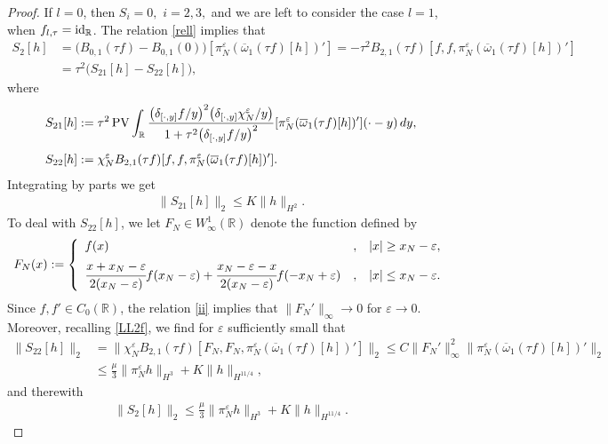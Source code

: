 \documentclass[11pt,reqno]{amsart}
\numberwithin{equation}{section}
\newcommand{\PV}{\mathop{\rm PV}\nolimits}
\newcommand{\0}{\Omega}
\newcommand{\e}{\varepsilon}
\newcommand{\ov}{\overline}
\newcommand{\oo}{\ov\omega}
\newcommand{\R}{\mathbb{R}}
\numberwithin{equation}{section}
\begin{document}
\begin{proof}
If $l=0$, then $S_i=0,$ $i=2,3,$ and   we are left to consider the case $l=1$, when $f_{l,\tau}={\rm id}_\R $.
The relation \eqref{rell} implies that
\begin{align*}
 S_2[h]&= \big(B_{0,1}(\tau f) -B_{0,1}(0)\big)  [\pi^\e_N(\oo_1(\tau f)[h])' ]=-\tau^2B_{2,1}(\tau f) [f,f,\pi^\e_N(\oo_1(\tau f)[h])' ]\\[1ex]
 &=\tau^2\big(S_{21}[h]-S_{22}[h]\big),
\end{align*}
where
\begin{align*}
 S_{21}[h]&:= \tau^2\PV\int_\R\frac{\big(\delta_{[\cdot,y]} f/y\big)^2\big(\delta_{[\cdot,y]}\chi_N^\e/y\big)}{1+\tau^2\big( \delta_{[\cdot,y]} f/y\big)^2}[\pi^\e_N(\oo_1(\tau f)[h])' ](\cdot-y)\, dy,\\[1ex]
 S_{22}[h]&:= \chi_N^\e B_{2,1}( \tau f) [f,f, \pi^\e_N(\oo_1(\tau f)[h])' ].
\end{align*}
Integrating by parts we get
\begin{align*}
  \|S_{21}[h]\|_{2}\leq   K\|h\|_{H^2}.
\end{align*}
To deal with $S_{22}[h]$, we let $F_N\in W^1_\infty(\R)$ denote  the function defined by
\[
F_N(x):=\left\{
\begin{array}{lll}
f(x)&,& |x|\geq x_N-\e, \\[1ex]
\cfrac{x+x_N-\e}{2(x_N-\e)}f(x_N-\e)+\cfrac{x_N-\e-x}{2(x_N-\e)}f(-x_N+\e)&,& |x|\leq x_N-\e.
\end{array}
\right.
\]
Since $f, f'\in C_0(\R)$, the relation \eqref{ii} implies that $\|F_N'\|_\infty\to0 $ for $\e\to0$.
Moreover, recalling \eqref{LL2f}, we find for $\e$   sufficiently small that
\begin{align*}
 \|S_{22}[h]\|_2&=\| \chi_N^\e B_{2,1}(\tau f) [F_N,F_N,\pi^\e_N(\oo_1(\tau f)[h])' ]\|_2\leq C\|F_N'\|_\infty^2\|\pi^\e_N(\oo_1(\tau f)[h])' \|_2\\[1ex]
 &\leq\frac{\mu}{3}\|\pi^\e_N h \|_{H^3}+ K\|h\|_{H^{11/4}},
\end{align*}
and therewith
\begin{align}
  \|S_{2}[h]\|_{2}\leq  \frac{\mu}{3}\|\pi^\e_N h \|_{H^3}+ K\|h\|_{H^{11/4}}.\label{LR2}
\end{align}




\end{proof}
\end{document}
